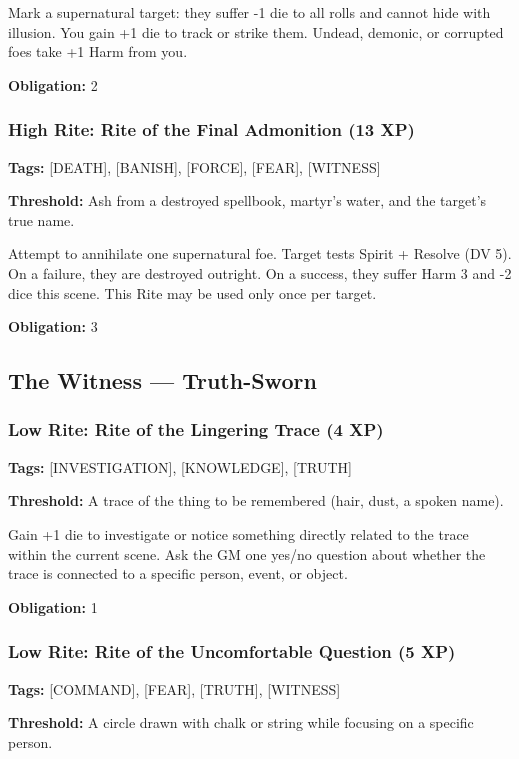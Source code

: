 Mark a supernatural target: they suffer -1 die to all rolls and cannot hide with illusion. You gain +1 die to track or strike them. Undead, demonic, or corrupted foes take +1 Harm from you.

\textbf{Obligation:} 2

\subsubsection{High Rite: Rite of the Final Admonition (13 XP)}

\textbf{Tags:} [DEATH], [BANISH], [FORCE], [FEAR], [WITNESS]

\textbf{Threshold:} Ash from a destroyed spellbook, martyr's water, and the target's true name.

Attempt to annihilate one supernatural foe. Target tests Spirit + Resolve (DV 5). On a failure, they are destroyed outright. On a success, they suffer Harm 3 and -2 dice this scene. This Rite may be used only once per target.

\textbf{Obligation:} 3

\subsection{The Witness — Truth-Sworn}

\subsubsection{Low Rite: Rite of the Lingering Trace (4 XP)}

\textbf{Tags:} [INVESTIGATION], [KNOWLEDGE], [TRUTH]

\textbf{Threshold:} A trace of the thing to be remembered (hair, dust, a spoken name).

Gain +1 die to investigate or notice something directly related to the trace within the current scene. Ask the GM one yes/no question about whether the trace is connected to a specific person, event, or object.

\textbf{Obligation:} 1

\subsubsection{Low Rite: Rite of the Uncomfortable Question (5 XP)}

\textbf{Tags:} [COMMAND], [FEAR], [TRUTH], [WITNESS]

\textbf{Threshold:} A circle drawn with chalk or string while focusing on a specific person.

